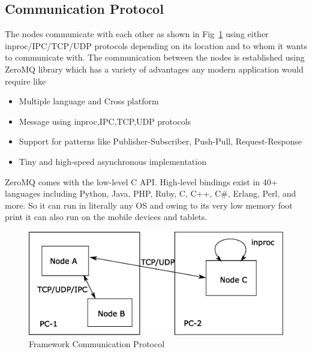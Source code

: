 \subsection{Communication Protocol}	
	The nodes communicate with each other as shown in Fig~\ref{fig:framework} using either inproc/IPC/TCP/UDP protocols depending on its location and to whom it wants to communicate with. The communication between the nodes is established using ZeroMQ\cite{ZeroMQ} library which has a variety of advantages any modern application would require like  
\begin{itemize}
\item Multiple language and Cross platform
\item Message using inproc,IPC,TCP,UDP protocols
\item Support for patterns like Publisher-Subscriber, Push-Pull, Request-Response
\item Tiny and high-speed asynchronous implementation
\end{itemize}
	ZeroMQ comes with the low-level C API. High-level bindings exist in 40+ languages including Python, Java, PHP, Ruby, C, C++, C\#, Erlang, Perl, and more. So it can run in literally any OS and owing to its very low memory foot print it can also run on the mobile devices and tablets.
\begin{figure}
\centering
\includegraphics[width=\textwidth]{assets/architecture_comm.eps}
\caption[Framework Communication Protocol]{Framework Communication Protocol}
\label{fig:framework}
\end{figure}
